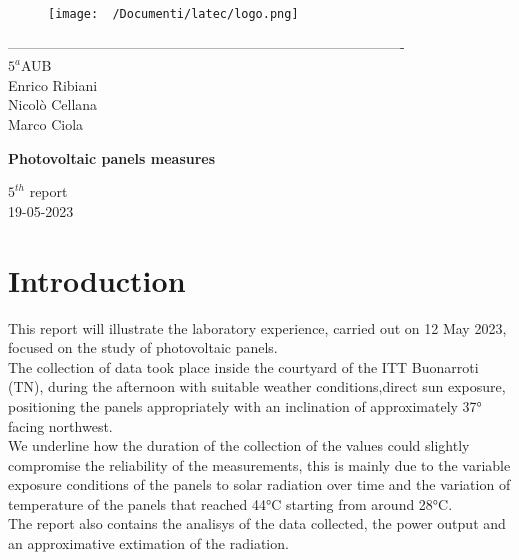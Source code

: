 \documentclass[12pt]{article}
\begin{document}
\begin{titlepage}
	\begin{center}
		\begin{figure}
			\centering
			\texttt{[image: ~/Documenti/latec/logo.png]}
			\label{fig:logo}
		\end{figure}
		-------------------------------------------------------------------------------------\\
		\vspace{2\baselineskip}
		\large $5^a$AUB\\
		\large Enrico Ribiani\\
		\large Nicolò Cellana\\
		\large Marco Ciola\\


		\vfill

		\Huge{\textbf{Photovoltaic panels measures}}\\
		\vfill

		\LARGE{$5^{th}$ report}\\
		\vfill
		\large{19-05-2023}
	\end{center}
\end{titlepage}
\tableofcontents
\newpage
{}
\setcounter{page}{1}
\section{Introduction}
This report will illustrate the laboratory experience, carried out on 12 May 2023, focused on the study of
photovoltaic panels.\\
The collection of data took place inside the courtyard of the ITT Buonarroti (TN), during the
afternoon with suitable weather conditions,direct sun exposure, positioning the panels appropriately with an
inclination of approximately 37° facing northwest.\\
We underline how the duration of the collection of the values could slightly compromise the reliability of
the measurements, this is mainly due to the variable exposure conditions of the panels to solar radiation
over time and the variation of temperature of the panels that reached 44°C starting from around 28°C.\\
The report also contains the analisys of the data collected, the power output and an approximative extimation
of the radiation.\\
\end{document}
